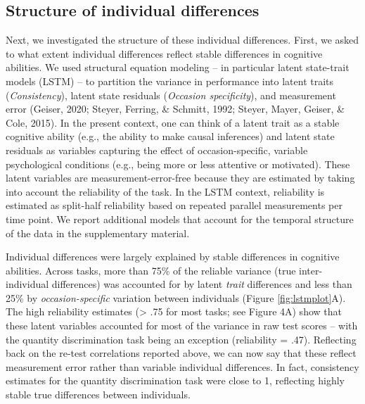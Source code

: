 \documentclass[
  man,floatsintext]{apa6}
\begin{document}
\hypertarget{structure-of-individual-differences}{%
\subsection{Structure of individual differences}\label{structure-of-individual-differences}}

Next, we investigated the structure of these individual differences. First, we asked to what extent individual differences reflect stable differences in cognitive abilities. We used structural equation modeling -- in particular latent state-trait models (LSTM) -- to partition the variance in performance into latent traits (\emph{Consistency}), latent state residuals (\emph{Occasion specificity}), and measurement error (Geiser, 2020; Steyer, Ferring, \& Schmitt, 1992; Steyer, Mayer, Geiser, \& Cole, 2015). In the present context, one can think of a latent trait as a stable cognitive ability (e.g., the ability to make causal inferences) and latent state residuals as variables capturing the effect of occasion-specific, variable psychological conditions (e.g., being more or less attentive or motivated). These latent variables are measurement-error-free because they are estimated by taking into account the reliability of the task. In the LSTM context, reliability is estimated as split-half reliability based on repeated parallel measurements per time point. We report additional models that account for the temporal structure of the data in the supplementary material.

Individual differences were largely explained by stable differences in cognitive abilities. Across tasks, more than 75\% of the reliable variance (true inter-individual differences) was accounted for by latent \emph{trait} differences and less than 25\% by \emph{occasion-specific} variation between individuals (Figure \ref{fig:lstmplot}A). The high reliability estimates (\textgreater{} .75 for most tasks; see Figure 4A) show that these latent variables accounted for most of the variance in raw test scores -- with the quantity discrimination task being an exception (reliability = .47). Reflecting back on the re-test correlations reported above, we can now say that these reflect measurement error rather than variable individual differences. In fact, consistency estimates for the quantity discrimination task were close to 1, reflecting highly stable true differences between individuals.
\end{document}
